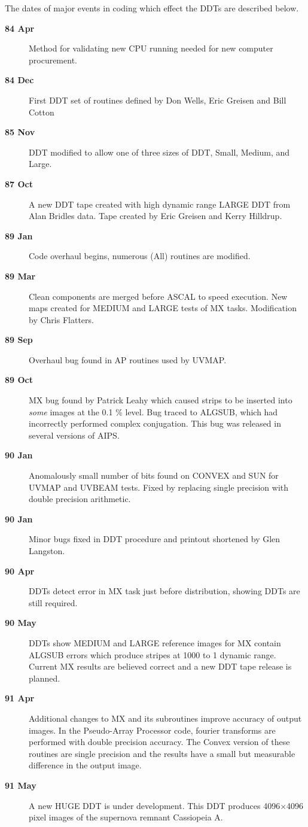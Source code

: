 The dates of major events in \AIPS coding which effect the
DDTs are described below.
\begin{description}
\item [\bf 84 Apr] Method for validating new CPU running \AIPS
needed for new computer procurement.
\item [\bf 84 Dec] First DDT set of routines defined by
Don Wells, Eric Greisen and Bill Cotton
\item [\bf 85 Nov] DDT modified to allow one of three
sizes of DDT, Small, Medium, and Large.
\item[\bf 87 Oct] A new DDT tape created
with high dynamic range LARGE DDT from Alan Bridles data.
Tape created by Eric Greisen and Kerry Hilldrup.
\item[\bf 89 Jan] Code overhaul begins, numerous (All)
routines are modified.
\item[\bf 89 Mar] Clean components are merged before
ASCAL to speed execution.
New maps created for MEDIUM and LARGE tests of MX tasks.
Modification by Chris Flatters.
\item[\bf 89 Sep] Overhaul bug found in AP routines
used by UVMAP.
\item[\bf 89 Oct] MX bug found by Patrick Leahy
which caused strips to be inserted into {\it some}
images at the 0.1 \% level.
Bug traced to ALGSUB, which had
incorrectly performed complex conjugation.
This bug was released in several versions of AIPS.
\item [\bf 90 Jan] Anomalously small number of bits found
on CONVEX and SUN for UVMAP and UVBEAM tests.
Fixed by replacing single precision with double precision
arithmetic.
\item[\bf 90 Jan] Minor bugs fixed in DDT procedure
and printout shortened by Glen Langston.
\item[\bf 90 Apr] DDTs detect error in MX task just before
distribution, showing DDTs are still required.
\item[\bf 90 May] DDTs show MEDIUM and LARGE reference images
for MX contain ALGSUB errors which produce stripes at 1000 to
1 dynamic range.  Current MX results are believed correct
and a new DDT tape release is planned.
\item[\bf 91 Apr] Additional changes to MX and its subroutines
improve accuracy of output images.  In the Pseudo-Array Processor
code, fourier transforms are performed with double precision
accuracy.  The Convex version of these routines are single
precision and the results have a small but measurable difference
in the output image.
\item[\bf 91 May] A new HUGE DDT is under development.
This DDT produces 4096$\times$4096 pixel images of the supernova
remnant Cassiopeia A.
\end{description}
\parindent 0in

